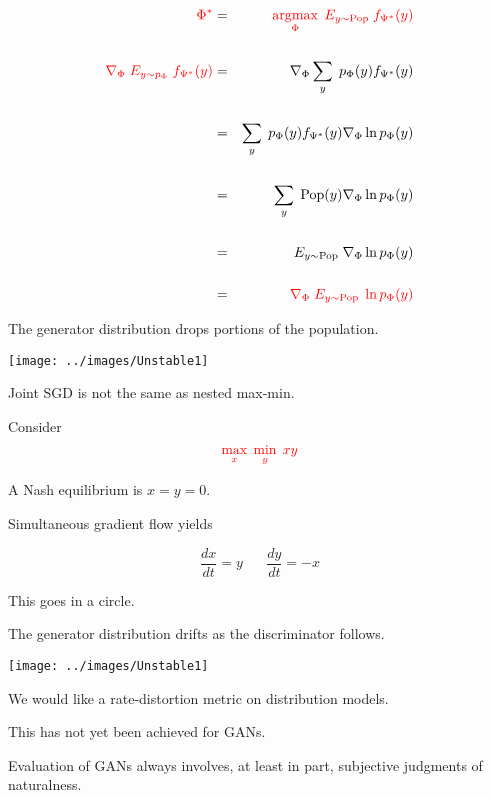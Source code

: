 {{{\huge
\begin{eqnarray*}
 {\color{red} \Phi^*}& = & {\color{red} \operatorname*{argmax}_\Phi\;E_{y \sim \mathrm{Pop}} \;f_{\Psi^*}(y)} \\
 \\
 {\color{red} \nabla_\Phi \; E_{y \sim p_\Phi}\;  f_{\Psi^*}(y)}  & = & \nabla _\Phi \sum_y\; p_\Phi(y) f_{\Psi^*}(y) \\
  \\
  & = & \sum_y \; p_\Phi(y) f_{\Psi^*}(y) \nabla_\Phi \ln p_\Phi(y) \\
  \\
  & = & \sum_y \;\mathrm{Pop}(y) \nabla_\Phi \ln p_\Phi(y) \\
  \\
  & = & E_{y \sim \mathrm{Pop}} \; \nabla_\Phi \ln p_\Phi(y) \\
  \\
  & = & {\color{red} \nabla_\Phi \; E_{y \sim \mathrm{Pop}} \;\ln p_\Phi(y)}
\end{eqnarray*}
}
}



The generator distribution drops portions of the population.

\centerline{\texttt{[image: ../images/Unstable1]}}


Joint SGD is not the same as nested max-min.

\vfill
Consider
$${\color{red} \max_x \; \min_y\; xy}$$

\vfill
A Nash equilibrium is $x= y = 0$.

\vfill
Simultaneous gradient flow yields

{\color{red} $$\frac{dx}{dt}  =  y \;\;\;\;\;\;\frac{dy}{dt} = -x$$}

\vfill
This goes in a circle.


The generator distribution drifts as the discriminator follows.

\centerline{\texttt{[image: ../images/Unstable1]}}


We would like a rate-distortion metric on distribution models.

\vfill
This has not yet been achieved for GANs.

\vfill
Evaluation of GANs always involves, at least in part, subjective judgments of naturalness.

}
